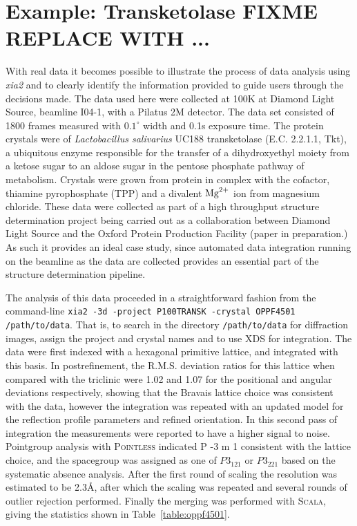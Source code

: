 \documentclass[preprint,pdf]{iucr}
\begin{document}
\section{Example: Transketolase FIXME REPLACE WITH ...}

With real data it becomes possible to illustrate the process of data
analysis using \emph{xia2} and to clearly identify the information
provided to guide users through the decisions made. The data
used here were collected at 100K at Diamond Light Source, beamline
I04-1, with a Pilatus 2M detector. The data set consisted of 1800
frames measured with $0.1^{\circ}$ width and 0.1s exposure time.
The protein crystals were of
\emph{Lactobacillus salivarius} UC188 transketolase (E.C. 2.2.1.1, Tkt), a
ubiquitous enzyme responsible for the transfer of a dihydroxyethyl
moiety from a ketose sugar to an aldose sugar in the pentose phosphate
pathway of metabolism. Crystals were grown from protein in complex
with the cofactor, thiamine pyrophosphate (TPP) and a divalent $\rm{Mg}^{2+}$
ion from magnesium chloride. These data were collected as part of
a high throughput structure determination project being carried out as
a collaboration between Diamond Light Source and the Oxford Protein
Production Facility (paper in preparation.) As such it provides an
ideal case study, since automated data integration running on the
beamline as the data are collected provides an essential part of the
structure determination pipeline. 

The analysis of this data proceeded in a straightforward fashion from
the command-line 
\verb|xia2 -3d -project P100TRANSK -crystal OPPF4501 /path/to/data|.
That is, to search in the directory \verb|/path/to/data| for
diffraction images, assign the project and crystal names and to use
XDS for integration. 
The data were first indexed with a hexagonal primitive lattice, and
integrated with this basis. In postrefinement, the R.M.S. deviation
ratios for this lattice when compared with the triclinic were 1.02 and
1.07 for the positional and angular deviations respectively, showing
that the Bravais lattice choice was consistent with the data, however
the integration was repeated with an updated model for the reflection
profile parameters
and refined orientation. In this second pass of integration the
measurements were reported to have a higher signal to noise. Pointgroup
analysis with \textsc{Pointless} indicated P -3 m 1 consistent with the lattice
choice, and the spacegroup was assigned as one of $P3_121$ or $P3_221$
based on the systematic absence analysis. After the first round of
scaling the resolution was estimated to be 2.3\AA, after which
the scaling was repeated and several rounds of outlier rejection
performed. Finally the merging was performed with \textsc{Scala}, giving the
statistics shown in Table~\ref{table:oppf4501}. 
\end{document}
